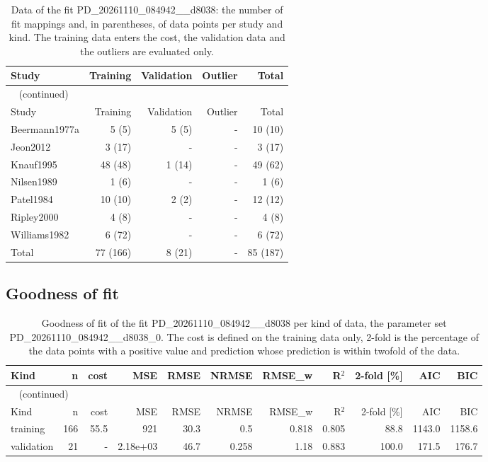 \begin{longtable}{lrrrr}
\caption{Data of the fit PD\_20261110\_084942\_\_d8038: the number of fit mappings and, in parentheses, of data points per study and kind. The training data enters the cost, the validation data and the outliers are evaluated only.}\label{tab:data:PD_20261110_084942__d8038} \\
\toprule
Study & Training & Validation & Outlier & Total \\
\midrule
\endfirsthead
\multicolumn{5}{l}{\small\tablename~\thetable{} (continued)} \\
\toprule
Study & Training & Validation & Outlier & Total \\
\midrule
\endhead
\bottomrule
\endlastfoot
Beermann1977a & 5 (5) & 5 (5) & - & 10 (10) \\
Jeon2012 & 3 (17) & - & - & 3 (17) \\
Knauf1995 & 48 (48) & 1 (14) & - & 49 (62) \\
Nilsen1989 & 1 (6) & - & - & 1 (6) \\
Patel1984 & 10 (10) & 2 (2) & - & 12 (12) \\
Ripley2000 & 4 (8) & - & - & 4 (8) \\
Williams1982 & 6 (72) & - & - & 6 (72) \\
Total & 77 (166) & 8 (21) & - & 85 (187) \\
\end{longtable}

\subsection{Goodness of fit}

\begin{longtable}{lrrrrrrrrrr}
\caption{Goodness of fit of the fit PD\_20261110\_084942\_\_d8038 per kind of data, the parameter set PD\_20261110\_084942\_\_d8038\_0. The cost is defined on the training data only, 2-fold is the percentage of the data points with a positive value and prediction whose prediction is within twofold of the data.}\label{tab:metrics:PD_20261110_084942__d8038} \\
\toprule
Kind & n & cost & MSE & RMSE & NRMSE & RMSE\_w & R\ensuremath{^{2}} & 2-fold [\%] & AIC & BIC \\
\midrule
\endfirsthead
\multicolumn{11}{l}{\small\tablename~\thetable{} (continued)} \\
\toprule
Kind & n & cost & MSE & RMSE & NRMSE & RMSE\_w & R\ensuremath{^{2}} & 2-fold [\%] & AIC & BIC \\
\midrule
\endhead
\bottomrule
\endlastfoot
training & 166 & 55.5 & 921 & 30.3 & 0.5 & 0.818 & 0.805 & 88.8 & 1143.0 & 1158.6 \\
validation & 21 & - & 2.18e+03 & 46.7 & 0.258 & 1.18 & 0.883 & 100.0 & 171.5 & 176.7 \\
\end{longtable}

